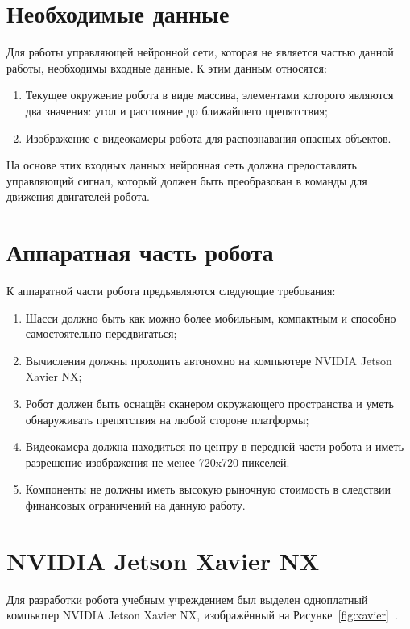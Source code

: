 \section{Необходимые данные}\label{sec:ch1/sec2}

Для работы управляющей нейронной сети, которая не является частью данной работы, необходимы входные данные. К этим данным относятся:
\begin{enumerate}[beginpenalty=10000] %
  \item Текущее окружение робота в виде массива, элементами которого являются два значения: угол и расстояние до ближайшего препятствия;
  \item Изображение с видеокамеры робота для распознавания опасных объектов.
\end{enumerate}

На основе этих входных данных нейронная сеть должна предоставлять управляющий сигнал, который должен быть преобразован в команды для движения двигателей робота.

\section{Аппаратная часть робота}\label{sec:ch1/sec3}

К аппаратной части робота предьявляются следующие требования:
\begin{enumerate}[beginpenalty=10000] %
  \item Шасси должно быть как можно более мобильным, компактным и способно самостоятельно передвигаться;
  \item Вычисления должны проходить автономно на компьютере NVIDIA Jetson Xavier NX;
  \item Робот должен быть оснащён сканером окружающего пространства и уметь обнаруживать препятствия на любой стороне платформы;
  \item Видеокамера должна находиться по центру в передней части робота и иметь разрешение изображения не менее 720x720 пикселей.
  \item Компоненты не должны иметь высокую рыночную стоимость в следствии финансовых ограничений на данную работу.
\end{enumerate}

\section{NVIDIA Jetson Xavier NX}
Для разработки робота учебным учреждением был выделен одноплатный компьютер NVIDIA Jetson Xavier NX, изображённый на Рисунке~\cref{fig:xavier}~\cite{xavier}.

